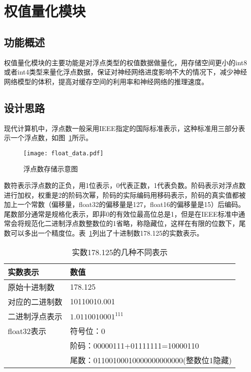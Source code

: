 \section {权值量化模块}

\subsection {功能概述}
权值量化模块的主要功能是对浮点类型的权值数据做量化，用存储空间更小的int8或者int4类型来量化浮点数据，保证对神经网络进度影响不大的情况下，减少神经网络模型的体积，提高对缓存空间的利用率和神经网络的推理速度。

\subsection {设计思路}
现代计算机中，浮点数一般采用IEEE指定的国际标准表示，这种标准用三部分表示一个浮点数，如图~\ref{fig:float-data}所示。

\begin{figure}[htb]
  \centering
  \texttt{[image: float\_data.pdf]}
  \caption{浮点数存储示意图}
  \label{fig:float-data}
\end{figure}

数符表示浮点数的正负，用1位表示，0代表正数，1代表负数。阶码表示对浮点数进行加权，权重是2的阶码次幂，阶码的实际编码用移码表示，阶码的真实值都被加上一个常数（偏移量，float32的偏移量是127，float16的偏移量是15）后编码。尾数部分通常是规格化表示，即非0的有效位最高位总是1，但是在IEEE标准中通常会将规范化二进制浮点数整数位的1省略，称隐藏位，这样在有限的位数下，尾数可以多出一个精度位。表~\ref{tab:float32-tab}列出了十进制数178.125的实数表示。

\begin{table}[htb]
  \centering\small
  \caption{实数178.125的几种不同表示}
  \label{tab:float32-tab}
  \begin{tabular}{ll}
    \toprule
    实数表示       & 数值   \\
    \midrule
    原始十进制数   & 178.125 \\
    对应的二进制数 & 10110010.001 \\
    二进制浮点表示 & $1.0110010001^{111} $\\
    float32表示  & 符号位：0 \\ 
                 & 阶码：00000111+01111111=10000110 \\ 
                 & 尾数：01100100010000000000000(整数位1隐藏)\\
    \bottomrule
  \end{tabular}
\end{table}

